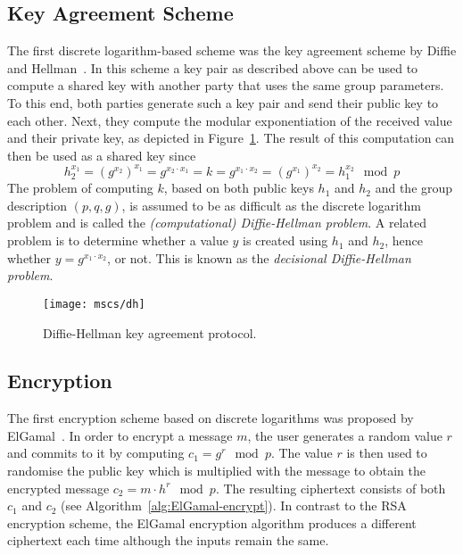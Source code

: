 \subsection{Key Agreement Scheme}

The first discrete logarithm-based scheme was the key agreement scheme by Diffie
and Hellman~\cite{DH1976}. In this scheme a key pair as described above can be
used to compute a shared key with another party that uses the same group
parameters. To this end, both parties generate such a key pair and send their
public key to each other. Next, they compute the modular exponentiation of the
received value and their private key, as depicted in Figure~\ref{msc:DH}. The
result of this computation can then be used as a shared key
since
\begin{equation*}
  h_2^{x_1} = (g^{x_2})^{x_1} = g^{x_2 \cdot x_1}
  = k = g^{x_1 \cdot x_2} = (g^{x_1})^{x_2} = h_1^{x_2} \mod p
\end{equation*}
The problem of computing $k$, based on both public keys $h_1$ and $h_2$ and the
group description $(p, q, g)$, is assumed to be as difficult as the discrete
logarithm problem and is called the \emph{(computational) Diffie-Hellman problem}. A related
problem is to determine whether a value $y$ is created using $h_1$ and $h_2$,
hence whether $y = g^{x_1 \cdot x_2}$, or not. This is known as the
\emph{decisional Diffie-Hellman problem}.

\begin{figure}[t]
  \centering
  \texttt{[image: mscs/dh]}
  \caption{Diffie-Hellman key agreement protocol.}
  \label{msc:DH}
\end{figure}

\subsection{Encryption}

The first encryption scheme based on discrete logarithms was proposed by
ElGamal~\cite{ElGamal1985}. In order to encrypt a message $m$, the user
generates a random value $r$ and commits to it by computing $c_1 = g^r \mod p$.
The value $r$ is then used to randomise the public key which is multiplied with
the message to obtain the encrypted message $c_2 = m \cdot h^r \mod p$. The
resulting ciphertext consists of both $c_1$ and $c_2$ (see Algorithm~\ref{alg:ElGamal-encrypt}).
In contrast to the RSA encryption scheme, the ElGamal encryption algorithm
produces a different ciphertext each time although the inputs remain the same.

